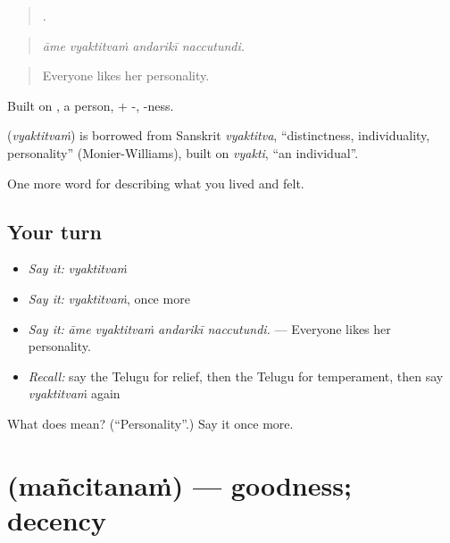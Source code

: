 \begin{quote}
   .
\end{quote}

\begin{quote}
\emph{āme vyaktitvaṁ andarikī naccutundi.}
\end{quote}

\begin{quote}
Everyone likes her personality.
\end{quote}

Built on , a person, + -, -ness.

\begin{cousinweb}
\textbf{} (\emph{vyaktitvaṁ}) is borrowed from Sanskrit \emph{vyaktitva}, \textquotedblleft{}distinctness, individuality, personality\textquotedblright{} (Monier-Williams), built on \emph{vyakti}, \textquotedblleft{}an individual\textquotedblright{}.
\end{cousinweb}

\begin{grammarlens}[title={What you've built}]
One more word for describing what you lived and felt.
\end{grammarlens}

\subsection*{Your turn}
\begin{itemize}
\raggedright
  \item \emph{Say it:} \emph{vyaktitvaṁ}
  \item \emph{Say it:} \emph{vyaktitvaṁ}, once more
  \item \emph{Say it:} \emph{āme vyaktitvaṁ andarikī naccutundi.} — Everyone likes her personality.
  \item \emph{Recall:} say the Telugu for relief, then the Telugu for temperament, then say \emph{vyaktitvaṁ} again
\end{itemize}

\begin{tcolorbox}[breakable,colback=teal!4,colframe=teal!35!black,title={Before you move on}]
What does  mean? (\textquotedblleft{}Personality\textquotedblright{}.) Say it once more.
\end{tcolorbox}
\section[\texorpdfstring{\te{మంచితనం} (mañcitanaṁ)}{మంచితనం (mañcitanaṁ)}]{ (mañcitanaṁ) — goodness; decency}

